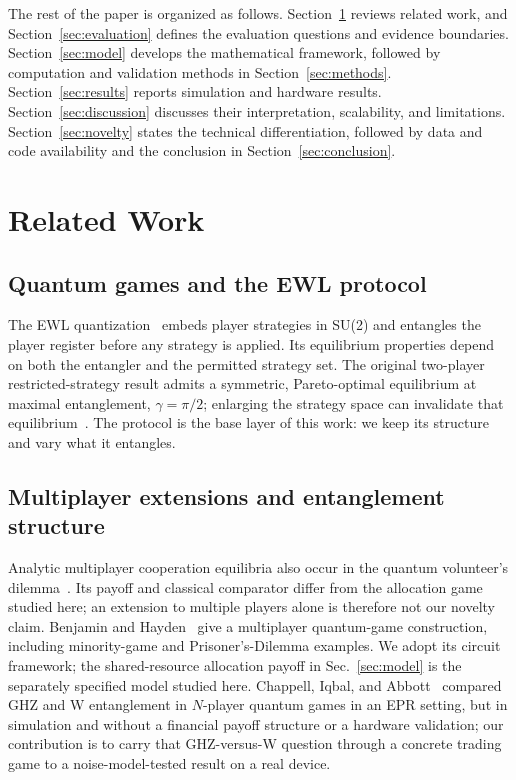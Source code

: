 \documentclass[conference,letterpaper,10pt]{IEEEtran}
\begin{document}
The rest of the paper is organized as follows. Section~\ref{sec:related}
reviews related work, and Section~\ref{sec:evaluation} defines the evaluation
questions and evidence boundaries. Section~\ref{sec:model} develops the
mathematical framework, followed by computation and validation methods in
Section~\ref{sec:methods}. Section~\ref{sec:results} reports simulation and
hardware results. Section~\ref{sec:discussion} discusses their interpretation,
scalability, and limitations. Section~\ref{sec:novelty} states the technical
differentiation, followed by data and code availability and the conclusion
in Section~\ref{sec:conclusion}.

\section{Related Work}\label{sec:related}

\subsection{Quantum games and the EWL protocol}
The EWL quantization~\cite{eisert1999} embeds player strategies in SU(2) and
entangles the player register before any strategy is applied. Its equilibrium
properties depend on both the entangler and the permitted strategy set.
The original two-player restricted-strategy result admits a symmetric,
Pareto-optimal equilibrium at maximal entanglement, $\gamma=\pi/2$;
enlarging the strategy space can invalidate that
equilibrium~\cite{eisert1999,benjamin2001comment}. The protocol is the base
layer of this work: we keep its structure and vary what it entangles.

\subsection{Multiplayer extensions and entanglement structure}
Analytic multiplayer cooperation equilibria also occur in the quantum
volunteer's dilemma~\cite{koh2025volunteer}. Its payoff and classical
comparator differ from the allocation game studied here; an extension to
multiple players alone is therefore not our novelty claim.
Benjamin and Hayden~\cite{benjamin2001} give a multiplayer quantum-game
construction, including minority-game and Prisoner's-Dilemma examples.
We adopt its circuit framework; the shared-resource allocation payoff in
Sec.~\ref{sec:model} is the separately specified model studied here.
Chappell, Iqbal, and Abbott~\cite{chappell2012}
compared GHZ and W entanglement in $N$-player quantum games in an EPR setting,
but in simulation and without a financial payoff structure or a hardware
validation; our contribution is to carry that GHZ-versus-W question through a
concrete trading game to a noise-model-tested result on a real device.
\end{document}
